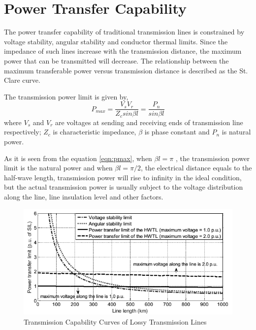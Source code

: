 \documentclass[12pt,a4paper]{reportmod}
\begin{document}
\section{Power Transfer Capability}
\par The power transfer capability of traditional transmission lines is constrained by voltage stability, angular stability and conductor thermal limits. Since the impedance of such lines increase with the transmission distance, the maximum power that can be transmitted will decrease. The relationship between the maximum transferable power versus transmission distance is described as the St. Clare curve.
\par The transmission power limit is given by,
\begin{equation}\label{eqn:pmax}
P_{max}=\frac{V_sV_r}{Z_csin\beta l}=\frac{P_n}{sin\beta l}
\end{equation}
where $V_s$ and $V_r$ are voltages at sending and receiving ends of transmission line respectively; $Z_c$  is characteristic
impedance, $\beta$ is phase constant and $P_n$ is natural power.
\par As it is seen from the equation \ref{eqn:pmax}, when $\beta l=\pi$ , the transmission power limit is the natural power and when $\beta l=\pi/2$, the electrical distance equals to the half-wave length, transmission power will rise to infinity in the ideal condition, but the actual transmission power is usually subject to the voltage distribution along the line, line insulation level and other factors.
\begin{figure}[h]
\label{fig:transcap}
\begin{center}
\includegraphics[scale=0.6]{transcap.png}
\caption{Transmission Capability Curves of Lossy Transmission Lines}
\end{center}
\end{figure}
\end{document}

